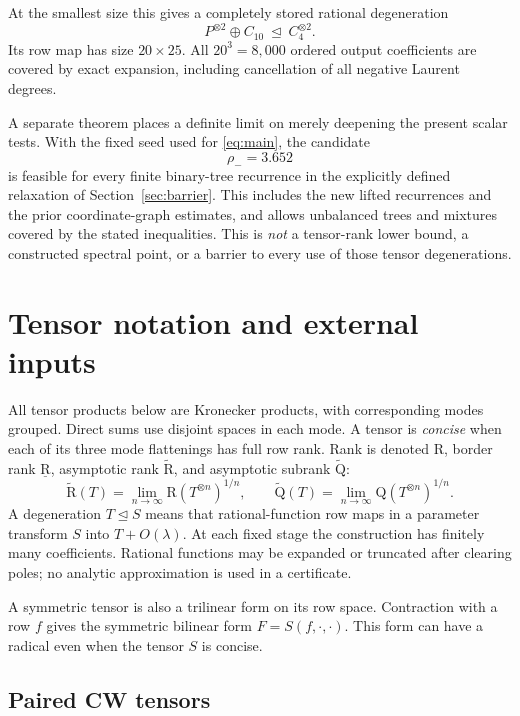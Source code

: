 \documentclass[11pt]{article}
\theoremstyle{definition}\newtheorem{definition}[theorem]{Definition}
\theoremstyle{remark}\newtheorem{remark}[theorem]{Remark}
\newcommand{\AR}{\widetilde{\mathrm R}}
\newcommand{\AQ}{\widetilde{\mathrm Q}}
\newcommand{\R}{\mathrm R}
\newcommand{\BR}{\underline{\mathrm R}}
\begin{document}
At the smallest size this gives a completely stored rational degeneration
\begin{equation}\label{eq:small-intro}
 P^{\otimes2}\oplus C_{10}\ \unlhd\ C_4^{\otimes2}.
\end{equation}
Its row map has size $20\times25$. All $20^3=8{,}000$ ordered output coefficients are covered by exact expansion, including cancellation of all negative Laurent degrees.

A separate theorem places a definite limit on merely deepening the present scalar tests. With the fixed seed used for \eqref{eq:main}, the candidate
\begin{equation}\label{eq:barrier-intro}
 \rho_-=3.652
\end{equation}
is feasible for every finite binary-tree recurrence in the explicitly defined relaxation of Section~\ref{sec:barrier}. This includes the new lifted recurrences and the prior coordinate-graph estimates, and allows unbalanced trees and mixtures covered by the stated inequalities. This is \emph{not} a tensor-rank lower bound, a constructed spectral point, or a barrier to every use of those tensor degenerations.

\clearpage
\section{Tensor notation and external inputs}\label{sec:notation}

All tensor products below are Kronecker products, with corresponding modes grouped. Direct sums use disjoint spaces in each mode. A tensor is \emph{concise} when each of its three mode flattenings has full row rank. Rank is denoted $\R$, border rank $\BR$, asymptotic rank $\AR$, and asymptotic subrank $\AQ$:
\[
 \AR(T)=\lim_{n\to\infty}\R(T^{\otimes n})^{1/n},
 \qquad
 \AQ(T)=\lim_{n\to\infty}\mathrm Q(T^{\otimes n})^{1/n}.
\]
A degeneration $T\unlhd S$ means that rational-function row maps in a parameter transform $S$ into $T+O(\lambda)$. At each fixed stage the construction has finitely many coefficients. Rational functions may be expanded or truncated after clearing poles; no analytic approximation is used in a certificate.

A symmetric tensor is also a trilinear form on its row space. Contraction with a row $f$ gives the symmetric bilinear form $F=S(f,\cdot,\cdot)$. This form can have a radical even when the tensor $S$ is concise.

\subsection{Paired CW tensors}
\end{document}
